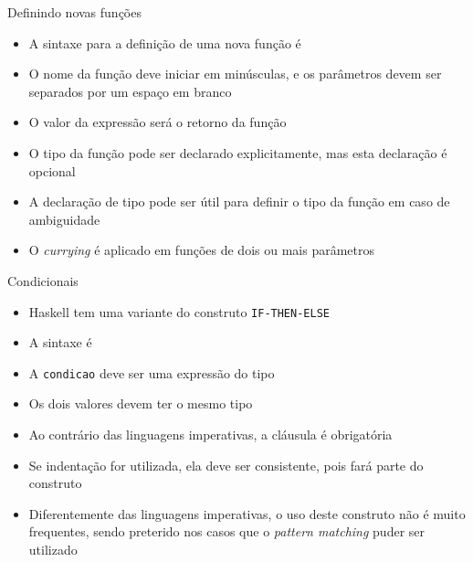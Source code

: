 \begin{frame}[fragile]{Definindo novas funções}

    \begin{itemize}
        \item A sintaxe para a definição de uma nova função é


        \item O nome da função deve iniciar em minúsculas, e os parâmetros devem ser separados
            por um espaço em branco

        \item O valor da expressão será o retorno da função

        \item O tipo da função pode ser declarado explicitamente, mas esta declaração é opcional


        \item A declaração de tipo pode ser útil para definir o tipo da função em caso de
            ambiguidade

        \item O \textit{currying} é aplicado em funções de dois ou mais parâmetros 

    \end{itemize}

\end{frame}

\begin{frame}[fragile]{Condicionais}

    \begin{itemize}
        \item Haskell tem uma variante do construto \texttt{IF-THEN-ELSE}

        \item A sintaxe é 


        \item A \texttt{condicao} deve ser uma expressão do tipo 

        \item Os dois valores devem ter o mesmo tipo

        \item Ao contrário das linguagens imperativas, a cláusula  é 
            obrigatória

        \item Se indentação for utilizada, ela deve ser consistente, pois fará parte
            do construto

        \item Diferentemente das linguagens imperativas, o uso deste construto não é muito
            frequentes, sendo preterido nos casos que o \textit{pattern matching} puder ser
            utilizado
    \end{itemize}

\end{frame}

